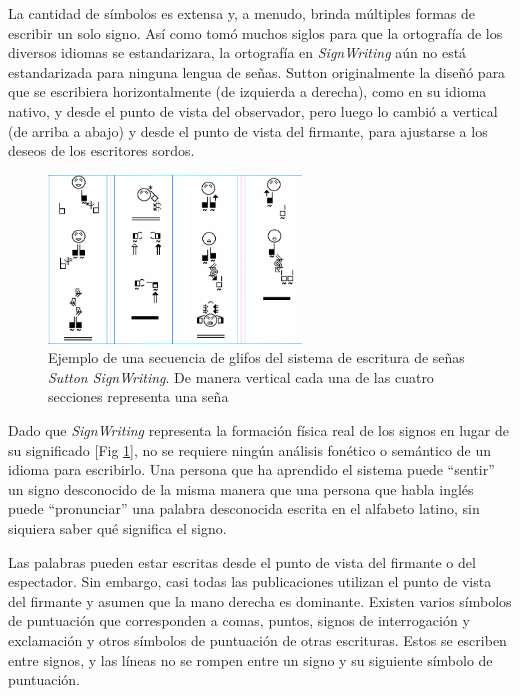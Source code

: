 La cantidad de símbolos es extensa y, a menudo, brinda múltiples formas de escribir un solo signo. Así como tomó muchos siglos para que la ortografía de los diversos idiomas se estandarizara, la ortografía en \textit{SignWriting} aún no está estandarizada para ninguna lengua de señas.
 Sutton originalmente la diseñó para que se escribiera horizontalmente (de izquierda a derecha), como en su idioma nativo, y desde el punto de vista del observador, pero luego lo cambió a vertical (de arriba a abajo) y desde el punto de vista del firmante, para ajustarse a los deseos de los escritores sordos.
 \begin{figure}[ht!]
    \centering
    \includegraphics[width=0.6\textwidth]{Graphics/arreglo_glifos_sutton.png}
    \caption{Ejemplo de una secuencia de glifos del sistema de escritura de señas \textit{Sutton SignWriting}. De manera vertical cada una de las cuatro secciones representa una seña}
    \label{fig:arreglo_glifos_sutton}
\end{figure}
 
 Dado que \textit{SignWriting} representa la formación física real de los signos en lugar de su significado [Fig \ref{fig:arreglo_glifos_sutton}], no se requiere ningún análisis fonético o semántico de un idioma para escribirlo. Una persona que ha aprendido el sistema puede ``sentir'' un signo desconocido de la misma manera que una persona que habla inglés puede ``pronunciar'' una palabra desconocida escrita en el alfabeto latino, sin siquiera saber qué significa el signo.

Las palabras pueden estar escritas desde el punto de vista del firmante o del espectador. Sin embargo, casi todas las publicaciones utilizan el punto de vista del firmante y asumen que la mano derecha es dominante. Existen varios símbolos de puntuación que corresponden a comas, puntos, signos de interrogación y exclamación y otros símbolos de puntuación de otras escrituras. Estos se escriben entre signos, y las líneas no se rompen entre un signo y su siguiente símbolo de puntuación.

